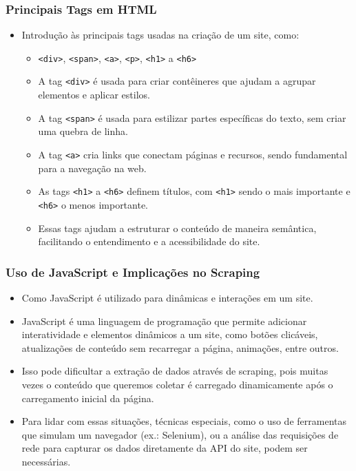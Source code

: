 \documentclass{beamer}
\begin{document}
\begin{frame}
  \frametitle{Principais Tags em HTML}
  \begin{itemize}
    \item Introdução às principais tags usadas na criação de um site, como:
    \begin{itemize}
      \item \texttt{<div>}, \texttt{<span>}, \texttt{<a>}, \texttt{<p>}, \texttt{<h1>} a \texttt{<h6>}
      \item A tag \texttt{<div>} é usada para criar contêineres que ajudam a agrupar elementos e aplicar estilos.
      \item A tag \texttt{<span>} é usada para estilizar partes específicas do texto, sem criar uma quebra de linha.
      \item A tag \texttt{<a>} cria links que conectam páginas e recursos, sendo fundamental para a navegação na web.
      \item As tags \texttt{<h1>} a \texttt{<h6>} definem títulos, com \texttt{<h1>} sendo o mais importante e \texttt{<h6>} o menos importante.
      \item Essas tags ajudam a estruturar o conteúdo de maneira semântica, facilitando o entendimento e a acessibilidade do site.
    \end{itemize}
  \end{itemize}
\end{frame}

\begin{frame}
  \frametitle{Uso de JavaScript e Implicações no Scraping}
  \begin{itemize}
    \item Como JavaScript é utilizado para dinâmicas e interações em um site.
    \item JavaScript é uma linguagem de programação que permite adicionar interatividade e elementos dinâmicos a um site, como botões clicáveis, atualizações de conteúdo sem recarregar a página, animações, entre outros.
    \item Isso pode dificultar a extração de dados através de scraping, pois muitas vezes o conteúdo que queremos coletar é carregado dinamicamente após o carregamento inicial da página.
    \item Para lidar com essas situações, técnicas especiais, como o uso de ferramentas que simulam um navegador (ex.: Selenium), ou a análise das requisições de rede para capturar os dados diretamente da API do site, podem ser necessárias.
  \end{itemize}
\end{frame}
\end{document}
